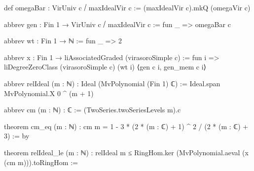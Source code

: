 \begin{leancode}
def omegaBar : VirUniv c ⧸ maxIdealVir c := (maxIdealVir c).mkQ (omegaVir c)

abbrev gen : Fin 1 → VirUniv c ⧸ maxIdealVir c := fun _ => omegaBar c

abbrev wt : Fin 1 → ℕ := fun _ => 2

abbrev x : Fin 1 → liAssociatedGraded (virasoroSimple c) :=
  fun i => liDegreeZeroClass (virasoroSimple c) (wt i) ⟨gen c i, gen_mem c i⟩

abbrev relIdeal (m : ℕ) : Ideal (MvPolynomial (Fin 1) ℂ) :=
  Ideal.span {MvPolynomial.X 0 ^ (m + 1)}

abbrev cm (m : ℕ) : ℂ := (TwoSeries.twoSeriesLevels m).c

theorem cm_eq (m : ℕ) :
    cm m = 1 - 3 * (2 * (m : ℂ) + 1) ^ 2 / (2 * (m : ℂ) + 3) := by

theorem relIdeal_le (m : ℕ) :
    relIdeal m ≤ RingHom.ker (MvPolynomial.aeval (x (cm m))).toRingHom :=
\end{leancode}

